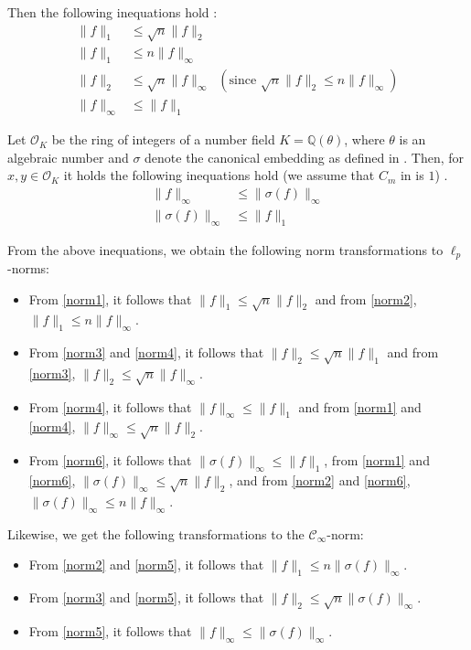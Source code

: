 Then the following inequations hold \cite{BDLOP18}:
\begin{align}
    \| f \|_1      & \leq \sqrt{n} \| f \|_2 \label{norm1}                                                                    \\
    \| f \|_1      & \leq n \| f \|_\infty \label{norm2}                                                                      \\
    \| f \|_2      & \leq \sqrt{n} \| f \|_\infty \;\;(\text{since }  \sqrt{n} \| f \|_2 \leq n \| f \|_\infty) \label{norm3} \\
    \| f \|_\infty & \leq \| f \|_1 \label{norm4}
\end{align}

Let $\mathcal{O}_K$ be the ring of integers of a number field $K=\mathbb{Q}(\theta)$, where $\theta$ is an algebraic number and $\sigma$ denote the canonical embedding as defined in \cite{DPSZ12}. Then, for $x, y \in \mathcal{O}_K$ it holds the following inequations hold (we assume that $C_m$ in \cite{DPSZ12} is $1$) \cite{DPSZ12}.
\begin{align}
    \| f \|_\infty         & \leq \| \sigma(f) \|_\infty \label{norm5} \\
    \| \sigma(f) \|_\infty & \leq \| f \|_1 \label{norm6}
\end{align}

From the above inequations, we obtain the following norm transformations to $\ell_p$-norms:
\begin{itemize}
    \item From \cref{norm1}, it follows that $\| f \|_1 \leq \sqrt{n} \| f \|_2$ and from \cref{norm2}, $\| f \|_1 \leq n \| f \|_\infty$.
    \item From \cref{norm3} and \cref{norm4}, it follows that $\| f \|_2 \leq \sqrt{n}  \| f \|_1$ and from \cref{norm3}, $\| f \|_2 \leq \sqrt{n}  \| f \|_\infty$.
    \item From \cref{norm4}, it follows that $\| f \|_\infty \leq  \| f \|_1$ and from \cref{norm1} and \cref{norm4}, $\| f \|_\infty \leq \sqrt{n}  \| f \|_2$.
    \item From \cref{norm6}, it follows that $\| \sigma(f) \|_\infty \leq  \| f \|_1$, from \cref{norm1} and \cref{norm6}, $\| \sigma(f) \|_\infty \leq \sqrt{n}  \| f \|_2$, and from \cref{norm2} and \cref{norm6}, $\| \sigma(f) \|_\infty \leq n  \| f \|_\infty$.
\end{itemize}

Likewise, we get the following transformations to the $\mathcal{C}_\infty$-norm:
\begin{itemize}
    \item From \cref{norm2} and \cref{norm5}, it follows that $\| f \|_1 \leq  n \| \sigma(f) \|_\infty$.
    \item From \cref{norm3} and \cref{norm5}, it follows that $\| f \|_2 \leq  \sqrt{n} \| \sigma(f) \|_\infty$.
    \item From \cref{norm5}, it follows that $\| f \|_\infty \leq  \| \sigma(f) \|_\infty$.
\end{itemize}

